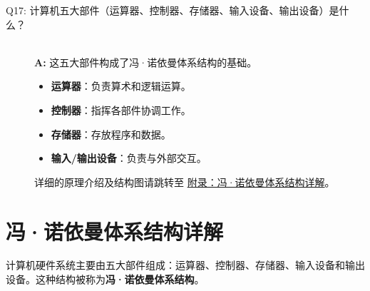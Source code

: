\documentclass[a4paper,12pt]{article}
\begin{document}
\begin{description}
    \item[Q17: 计算机五大部件（运算器、控制器、存储器、输入设备、输出设备）是什么？] \hfill \\
    \textbf{A:} 这五大部件构成了冯·诺依曼体系结构的基础。
    \begin{itemize}
        \item \textbf{运算器}：负责算术和逻辑运算。
        \item \textbf{控制器}：指挥各部件协调工作。
        \item \textbf{存储器}：存放程序和数据。
        \item \textbf{输入/输出设备}：负责与外部交互。
    \end{itemize}
    详细的原理介绍及结构图请跳转至 \hyperref[sec:von_neumann]{附录：冯·诺依曼体系结构详解}。
\end{description}

\appendix
\section{冯·诺依曼体系结构详解} \label{sec:von_neumann}

计算机硬件系统主要由五大部件组成：运算器、控制器、存储器、输入设备和输出设备。这种结构被称为\textbf{冯·诺依曼体系结构}。
\end{document}
